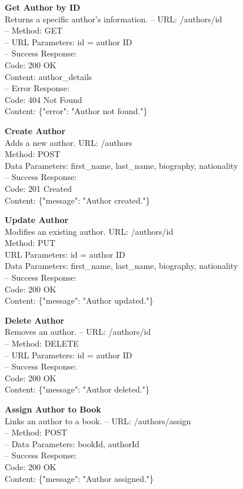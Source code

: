 \textbf{Get Author by ID} \\
Returns a specific author's information.
– URL: /authors/{id} \\
– Method: GET \\
– URL Parameters: id = author ID \\
– Success Response: \\
Code: 200 OK \\
Content: {author\_details} \\
– Error Response: \\
Code: 404 Not Found \\
Content: \{"error": "Author not found."\}

\textbf{Create Author} \\
Adds a new author.
URL: /authors \\
Method: POST \\
Data Parameters: first\_name, last\_name, biography, nationality \\
– Success Response: \\
Code: 201 Created \\
Content: \{"message": "Author created."\}

\textbf{Update Author} \\
Modifies an existing author.
URL: /authors/{id} \\
Method: PUT \\
URL Parameters: id = author ID \\
Data Parameters: first\_name, last\_name, biography, nationality \\
– Success Response: \\
Code: 200 OK \\
Content: \{"message": "Author updated."\}

\textbf{Delete Author} \\
Removes an author.
– URL: /authors/{id} \\
– Method: DELETE \\
– URL Parameters: id = author ID \\
– Success Response: \\
Code: 200 OK \\
Content: \{"message": "Author deleted."\}

\textbf{Assign Author to Book} \\
Links an author to a book.
– URL: /authors/assign \\
– Method: POST \\
– Data Parameters: bookId, authorId \\
– Success Response: \\
Code: 200 OK \\
Content: \{"message": "Author assigned."\}

